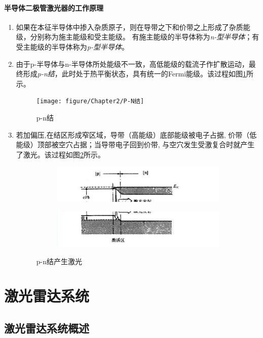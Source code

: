 \paragraph{半导体二极管激光器的工作原理}
\begin{enumerate}
	\item 如果在本征半导体中掺入杂质原子，则在导带之下和价带之上形成了杂质能级，分别称为施主能级和受主能级。
		有施主能级的半导体称为\textit{n-型半导体}；有受主能级的半导体称为\textit{p-型半导体}。
	\item 由于p-半导体与n-半导体所处能级不一致，高低能级的载流子作扩散运动，最终形成\textit{p-n结}，此时处于热平衡状态，具有统一的Fermi能级。该过程如图\ref{fig:p-n结}所示。
		\begin{figure}[htbp]
			\centering
			\texttt{[image: figure/Chapter2/P-N结]}
			\caption{p-n结}
			\label{fig:p-n结}
		\end{figure}
	\item 若加偏压,在结区形成窄区域，导带（高能级）底部能级被电子占据, 价带（低能级）顶部被空穴占据；当导带电子回到价带, 与空穴发生受激复合时就产生了激光。该过程如图\ref{fig:p-n结产生激光}所示。
		\begin{figure}[htbp]
			\centering
			\begin{subfigure}{\linewidth}
				\centering
				\includegraphics[width=0.7\linewidth]{figure/Chapter2/p-n结产生激光1}
			\end{subfigure}
			\begin{subfigure}{\linewidth}
				\centering
				\includegraphics[width=0.7\linewidth]{figure/Chapter2/p-n结产生激光2}
			\end{subfigure}
			\caption{p-n结产生激光}
			\label{fig:p-n结产生激光}
		\end{figure}
\end{enumerate}

\section{激光雷达系统} %
\subsection{激光雷达系统概述} %

